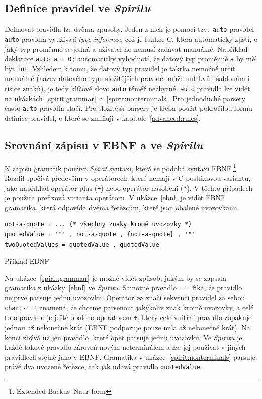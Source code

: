 \documentclass[thesis=B,czech,hidelinks]{FITthesis}[2019/03/06]
\newcommand{\Rplus}{\protect\hspace{-.1em}\protect\raisebox{.35ex}{\smaller{\smaller\textbf{+}}}}
\newcommand{\Cpp}{\mbox{C\Rplus\Rplus}\xspace}
\begin{document}
\subsection{Definice pravidel ve \textit{Spiritu}}
Definovat pravidla lze dvěma způsoby. Jeden z nich je pomocí tzv.\ \texttt{auto} pravidel \texttt{auto} pravidla využívají \textit{type inference}, což je funkce \Cpp{}, která automaticky zjistí, o jaký typ proměnné se jedná a uživatel ho nemusí zadávat manuálně. Například deklarace \verb¨auto a = 0;¨ automaticky vyhodnotí, že datový typ proměnně \texttt{a} by měl být \texttt{int}. Vzhledem k tomu, že datový typ pravidel je takřka nemožné určit manuálně (název datového typu složitějších pravidel může mít kvůli šablonám i tísice znaků), je tedy klíčové slovo \texttt{auto} téměř nezbytné. \texttt{auto} pravidla lze vidět na ukázkách~\ref{spirit:grammar}~a~\ref{spirit:nonterminals}. Pro jednoduché parsery často \texttt{auto} pravidla stačí. Pro složitější parsery je třeba použít pokročilou formu definice pravidel, o které se zmiňuji v kapitole~\ref{advanced:rules}.

\subsection{Srovnání zápisu v EBNF a ve \textit{Spiritu}}
K zápisu gramatik používá \textit{Spirit} syntaxi, která se podobá syntaxi EBNF.\footnote{Extended Backus--Naur form} Rozdíl spočívá především v operátorech, které nemají v \Cpp{} postfixovou variantu, jako například operátor plus (\texttt{+}) nebo operátor násobení (\texttt{*}). V těchto případech je použita prefixová varianta operátoru. V ukázce~\ref{ebnf} je vidět EBNF gramatika, která odpovídá dvěma řetězcům, které jsou obalené uvozovkami.

\begin{listing}
\begin{verbatim}
not-a-quote = ... (* všechny znaky kromě uvozovky *)
quotedValue = '"' , not-a-quote , {not-a-quote} , '"'
twoQuotedValues = quotedValue , quotedValue
\end{verbatim}
\caption{Příklad EBNF}\label{ebnf}
\end{listing}

Na ukázce~\ref{spirit:grammar} je možné vidět způsob, jakým by se zapsala gramatika z ukázky~\ref{ebnf} ve \textit{Spiritu}. Samotné pravidlo \verb¨'"'¨ řiká, že pravidlo nejprve parsuje jednu uvozovku. Operátor \verb¨>>¨ značí sekvenci pravidel za sebou. \verb¨char:-'"'¨ znamená, že chceme parsenout jakýkoliv znak kromě uvozovky, a celé toto pravidlo je ještě obaleno operátorem \verb¨+¨, který celé vnitřní pravidlo zopakuje jednou až nekonečně krát (EBNF podporuje pouze nula až nekonečně krát). Na konci zbývá už jen pravidlo, které opět parsuje jednu uvozovku. Ve \textit{Spiritu} je každé takové pravidlo zároveň novým neterminálem a lze jej používat v jiných pravidlech stejně jako v EBNF\@. Gramatika v ukázce~\ref{spirit:nonterminals} parsuje právě dva uvozené řetězce, tak jak udává pravidlo \texttt{quotedValue}.
\end{document}
